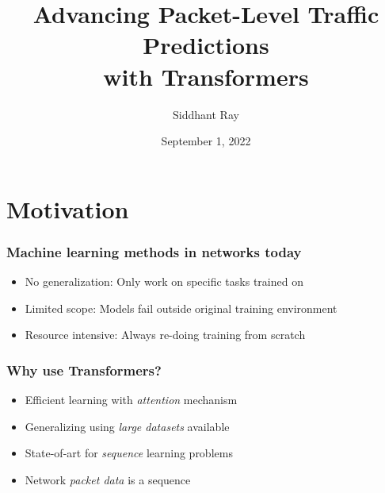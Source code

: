 \documentclass{beamer}
\title[Master Thesis] %
{Advancing Packet-Level Traffic Predictions\\ with Transformers}
\date{\tiny September 1, 2022}
\author[ Siddhant Ray] %
{Siddhant Ray}
\institute[ETH Zürich] %
{
  D-ITET \\
  ETH Zürich
}
\begin{document}
\frame{\titlepage}


%


\section{Motivation}

\begin{frame}
\frametitle{Machine learning methods in networks today}
\pause
\begin{itemize}
    \item<1-> \alert{No generalization: } Only work on specific tasks trained on
    \pause
    \item<2-> \alert{Limited scope: } Models fail outside original training environment 
    \pause
    \item<3-> \alert{Resource intensive: } Always re-doing training from scratch
   
\end{itemize}
\end{frame}



\begin{frame}
\frametitle{Why use Transformers?}
\pause
\begin{itemize}
    \item<1-> Efficient learning with \alert {\emph{attention}} mechanism
    \item<1-> Generalizing using \alert{\emph{large datasets}} available
    \pause
    \item<2-> State-of-art for \alert{\emph{sequence}} learning problems
     \item<2-> Network \alert{\emph{packet data}} is a sequence
\end{itemize}
\end{frame}
\end{document}
